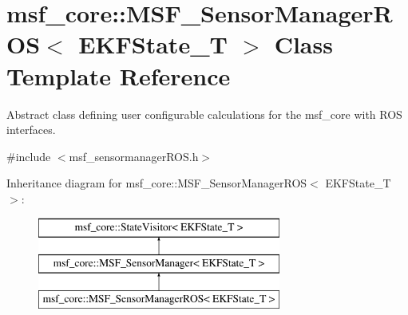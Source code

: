 \hypertarget{structmsf__core_1_1MSF__SensorManagerROS}{\section{msf\-\_\-core\-:\-:M\-S\-F\-\_\-\-Sensor\-Manager\-R\-O\-S$<$ E\-K\-F\-State\-\_\-\-T $>$ Class Template Reference}
\label{structmsf__core_1_1MSF__SensorManagerROS}
}


Abstract class defining user configurable calculations for the msf\-\_\-core with R\-O\-S interfaces.  




{\ttfamily \#include $<$msf\-\_\-sensormanager\-R\-O\-S.\-h$>$}

Inheritance diagram for msf\-\_\-core\-:\-:M\-S\-F\-\_\-\-Sensor\-Manager\-R\-O\-S$<$ E\-K\-F\-State\-\_\-\-T $>$\-:\begin{figure}[H]
\begin{center}
\leavevmode
\includegraphics[height=3.000000cm]{structmsf__core_1_1MSF__SensorManagerROS}
\end{center}
\end{figure}
